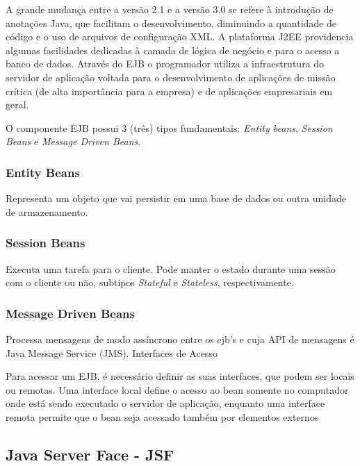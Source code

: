 \documentclass[12pt,a4paper]{article}
\begin{document}
A grande mudança entre a versão 2.1 e a versão 3.0 se refere à introdução de anotações Java, que facilitam o desenvolvimento, diminuindo a quantidade de código e o uso de arquivos de configuração XML. A plataforma J2EE providencia algumas facilidades dedicadas à camada de lógica de negócio e para o acesso a banco de dados. Através do EJB o programador utiliza a infraestrutura do servidor de aplicação voltada para o desenvolvimento de aplicações de missão crítica (de alta importância para a empresa) e de aplicações empresariais em geral.


O componente EJB possui 3 (três) tipos fundamentais: \textit{Entity beans}, \textit{Session Beans} e \textit{Message Driven Beans}.

\subsubsection{Entity Beans}

Representa um objeto que vai persistir  em uma base de dados ou outra unidade de armazenamento.

\subsubsection{Session Beans}

Executa uma tarefa para o cliente. Pode manter o estado durante uma sessão com o cliente ou não, subtipos \textit{Stateful} e \textit{Stateless}, respectivamente.

\subsubsection{Message Driven Beans}

Processa mensagens de modo assíncrono entre os ejb's e cuja API de mensagens é Java Message Service (JMS).
Interfaces de Acesso

Para acessar um EJB, é necessário definir as suas interfaces, que podem ser locais ou remotas. Uma interface local define o acesso ao bean somente no computador onde está sendo executado o servidor de aplicação, enquanto uma interface remota permite que o bean seja acessado também por elementos externos
\subsection{Java Server Face - JSF}
\end{document}
